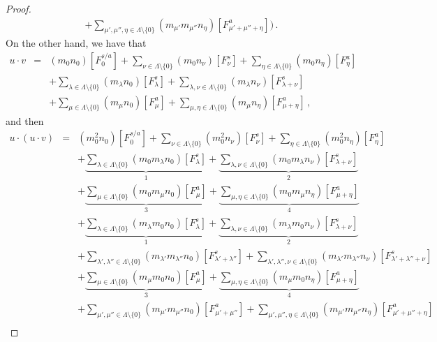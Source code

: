 \documentclass{jonasart}
\begin{document}
\begin{proof}
\begin{eqnarray*}
			+\sum_{\mu',\mu'',\eta\in\Lambda\setminus\{0\}}(m_{\mu'}m_{\mu''}n_\eta)[F_{\mu'+\mu''+\eta}^a ])\,.
		\end{eqnarray*}
		On the other hand, we have that
		\begin{eqnarray*}
			u\cdot v & = & (m_0 n_0 )[F_0^{s/a}]+\sum_{\nu\in\Lambda\setminus\{0\}}(m_0 n_\nu)[F_\nu^s ]
			+\sum_{\eta\in\Lambda\setminus\{0\}}(m_0 n_\eta)[F_\eta^a ]\\
			&& +\sum_{\lambda\in\Lambda\setminus\{0\}}(m_\lambda n_0 )[F_\lambda^s ]
			+\sum_{\lambda,\nu\in\Lambda\setminus\{0\}}(m_\lambda n_\nu)[F_{\lambda+\nu}^s ]\\
			&& +\sum_{\mu\in\Lambda\setminus\{0\}}(m_\mu n_0 )[F_\mu^a ]
			+\sum_{\mu,\eta\in\Lambda\setminus\{0\}}(m_\mu n_\eta)[F_{\mu+\eta}^a ]\,,
		\end{eqnarray*}
		and then
		\begin{eqnarray*}
			u\cdot(u\cdot v) & = & (m_0^2 n_0 )[F_0^{s/a}]+\sum_{\nu\in\Lambda\setminus\{0\}}(m_0^2 n_\nu)
			[F_\nu^s ]+\sum_{\eta\in\Lambda\setminus\{0\}}(m_0^2 n_\eta)[F_\eta^a ]\\
			&& +\underbrace{\sum_{\lambda\in\Lambda\setminus\{0\}}(m_0 m_\lambda n_0 )[F_\lambda^s ]}_{1}
			+\underbrace{\sum_{\lambda,\nu\in\Lambda\setminus\{0\}}(m_0 m_\lambda n_\nu)[F_{\lambda+\nu}^s ]}_{2}\\
			&& +\underbrace{\sum_{\mu\in\Lambda\setminus\{0\}}(m_0 m_\mu n_0 )[F_\mu^a ]}_{3}
			+\underbrace{\sum_{\mu,\eta\in\Lambda\setminus\{0\}}(m_0 m_\mu n_\eta)[F_{\mu+\eta}^a ]}_{4}\\
			&& +\underbrace{\sum_{\lambda\in\Lambda\setminus\{0\}}(m_\lambda m_0 n_0 )[F_\lambda^s ]}_{1}
			+\underbrace{\sum_{\lambda,\nu\in\Lambda\setminus\{0\}}(m_\lambda m_0 n_\nu)[F_{\lambda+\nu}^s ]}_{2}\\
			&& +\sum_{\lambda',\lambda''\in\Lambda\setminus\{0\}}(m_{\lambda'}m_{\lambda''}n_0 )
			[F_{\lambda'+\lambda''}^s ]
			+\sum_{\lambda',\lambda'',\nu\in\Lambda\setminus\{0\}}(m_{\lambda'}m_{\lambda''}n_\nu)
			[F_{\lambda'+\lambda''+\nu}^s ]\\
			&& +\underbrace{\sum_{\mu\in\Lambda\setminus\{0\}}(m_\mu m_0 n_0 )[F_\mu^a ]}_{3}
			+\underbrace{\sum_{\mu,\eta\in\Lambda\setminus\{0\}}(m_\mu m_0 n_\eta)[F_{\mu+\eta}^a ]}_{4}\\
			&& +\sum_{\mu',\mu''\in\Lambda\setminus\{0\}}(m_{\mu'}m_{\mu''}n_0 )[F_{\mu'+\mu''}^a ]
			+\sum_{\mu', \mu'', \eta\in\Lambda\setminus\{0\}}(m_{\mu'}m_{\mu''}n_\eta)[F_{\mu'+\mu''+\eta}^a ]\\

\end{eqnarray*}
\end{proof}
\end{document}
